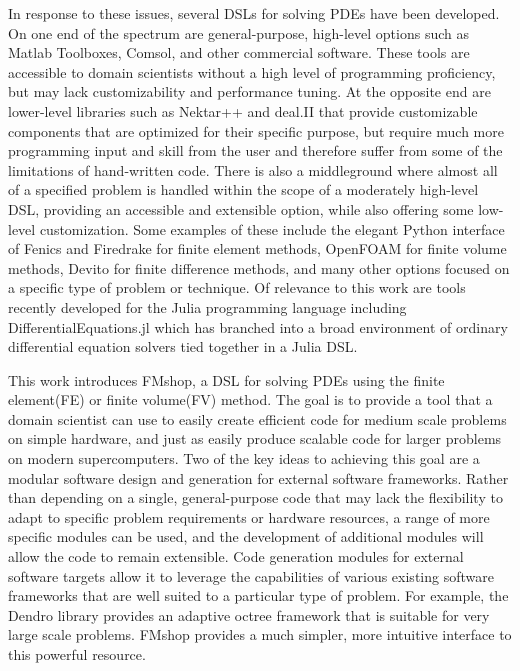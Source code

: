 \documentclass[twoside,leqno,twocolumn]{article}
\begin{document}
In response to these issues, several DSLs for solving PDEs have been developed. On one end of the spectrum are general-purpose, high-level options such as Matlab Toolboxes, Comsol, and other commercial software. These tools are accessible to domain scientists without a high level of programming proficiency, but may lack customizability and performance tuning. At the opposite end are lower-level libraries such as Nektar++\cite{nektar} and deal.II\cite{dealii} that provide customizable components that are optimized for their specific purpose, but require much more programming input and skill from the user and therefore suffer from some of the limitations of hand-written code. There is also a middleground where almost all of a specified problem is handled within the scope of a moderately high-level DSL, providing an accessible and extensible option, while also offering some low-level customization. Some examples of these include the elegant Python interface of Fenics\cite{fenics} and Firedrake\cite{firedrake} for finite element methods, OpenFOAM\cite{openfoam} for finite volume methods, Devito\cite{devito} for finite difference methods, and many other options focused on a specific type of problem or technique. Of relevance to this work are tools recently developed for the Julia programming language including DifferentialEquations.jl\cite{diffeqjl} which has branched into a broad environment of ordinary differential equation solvers tied together in a Julia DSL. 

This work introduces FMshop, a DSL for solving PDEs using the finite element(FE) or finite volume(FV) method. The goal is to provide a tool that a domain scientist can use to easily create efficient code for medium scale problems on simple hardware, and just as easily produce scalable code for larger problems on modern supercomputers. Two of the key ideas to achieving this goal are a modular software design and generation for external software frameworks. Rather than depending on a single, general-purpose code that may lack the flexibility to adapt to specific problem requirements or hardware resources, a range of more specific modules can be used, and the development of additional modules will allow the code to remain extensible. Code generation modules for external software targets allow it to leverage the capabilities of various existing software frameworks that are well suited to a particular type of problem. For example, the Dendro library\cite{dendro} provides an adaptive octree framework that is suitable for very large scale problems. FMshop provides a much simpler, more intuitive interface to this powerful resource.
\end{document}
